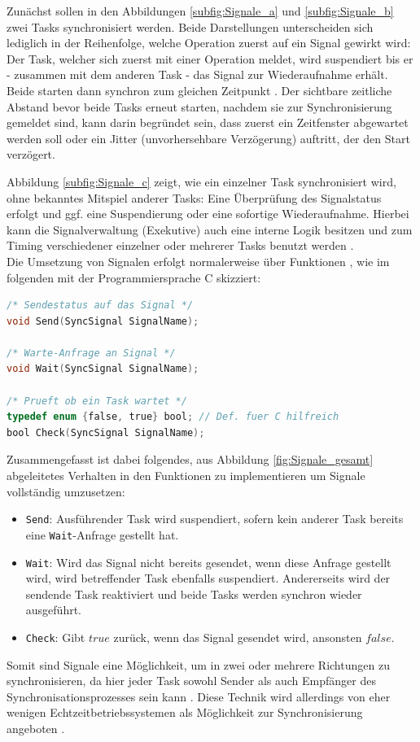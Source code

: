 \documentclass{llncs}
\begin{document}
Zunächst sollen in den Abbildungen \ref{subfig:Signale_a} und \ref{subfig:Signale_b} zwei Tasks synchronisiert werden. Beide Darstellungen unterscheiden sich lediglich in der Reihenfolge, welche Operation zuerst auf ein Signal gewirkt wird: Der Task, welcher sich zuerst mit einer Operation meldet, wird suspendiert bis er - zusammen mit dem anderen Task - das Signal zur Wiederaufnahme erhält. Beide starten dann synchron zum gleichen Zeitpunkt \autocite[vgl.][90-91]{Cooling2017}.
Der sichtbare zeitliche Abstand bevor beide Tasks erneut starten, nachdem sie zur Synchronisierung gemeldet sind, kann darin begründet sein, dass zuerst ein Zeitfenster abgewartet werden soll oder ein Jitter (unvorhersehbare Verzögerung) auftritt, der den Start verzögert.

Abbildung \ref{subfig:Signale_c} zeigt, wie ein einzelner Task synchronisiert wird, ohne bekanntes Mitspiel anderer Tasks: Eine Überprüfung des Signalstatus erfolgt und ggf. eine Suspendierung oder eine sofortige Wiederaufnahme. Hierbei kann die Signalverwaltung (Exekutive) auch eine interne Logik besitzen und zum Timing verschiedener einzelner oder mehrerer Tasks benutzt werden \autocite[vgl.][91]{Cooling2017}.\\

Die Umsetzung von Signalen erfolgt normalerweise über Funktionen \autocite[vgl.][91]{Cooling2017}, wie im folgenden mit der Programmiersprache C skizziert:
\begin{lstlisting}[language=C]
/* Sendestatus auf das Signal */
void Send(SyncSignal SignalName);

/* Warte-Anfrage an Signal */
void Wait(SyncSignal SignalName);

/* Prueft ob ein Task wartet */
typedef enum {false, true} bool; // Def. fuer C hilfreich
bool Check(SyncSignal SignalName);
\end{lstlisting}
Zusammengefasst ist dabei folgendes, aus Abbildung \ref{fig:Signale_gesamt} abgeleitetes Verhalten in den Funktionen zu implementieren um Signale vollständig umzusetzen:
\begin{itemize}
	\item \texttt{Send}: Ausführender Task wird suspendiert, sofern kein anderer Task bereits eine \texttt{Wait}-Anfrage gestellt hat.
	\item \texttt{Wait}: Wird das Signal nicht bereits gesendet, wenn diese Anfrage gestellt wird, wird betreffender Task ebenfalls suspendiert. Andererseits wird der \glqq sendende \grqq{} Task reaktiviert und beide Tasks werden synchron wieder ausgeführt.
	\item \texttt{Check}: Gibt $true$ zurück, wenn das Signal gesendet wird, ansonsten $false$.
\end{itemize}
Somit sind Signale eine Möglichkeit, um in zwei oder mehrere Richtungen zu synchronisieren, da hier jeder Task sowohl Sender als auch Empfänger des Synchronisationsprozesses sein kann \autocite[vgl.][91]{Cooling2017}. Diese Technik wird allerdings von eher wenigen Echtzeitbetriebssystemen als Möglichkeit zur Synchronisierung angeboten \autocite[vgl.][91]{Cooling2017}.
\end{document}
